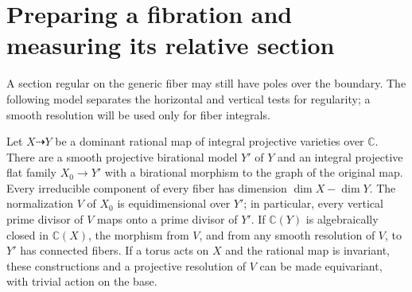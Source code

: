 \section{Preparing a fibration and measuring its relative section}\label{sec:models}

A section regular on the generic fiber may still have poles over the boundary. The following model separates the horizontal and vertical tests for regularity; a smooth resolution will be used only for fiber integrals.

\begin{lemma}\label{val:flat-model}
Let $X\dashrightarrow Y$ be a dominant rational map of integral projective
varieties over $\mathbb C$.  There are a smooth projective birational model
$Y'$ of $Y$ and an integral projective flat family $X_0\to Y'$ with a
birational morphism to the graph of the original map.  Every irreducible
component of every fiber has dimension $\dim X-\dim Y$.  The normalization
$V$ of $X_0$ is equidimensional over $Y'$; in particular, every vertical
prime divisor of $V$ maps onto a prime divisor of $Y'$.  If
$\mathbb C(Y)$ is algebraically closed in $\mathbb C(X)$, the morphism
from $V$, and from any smooth resolution of $V$, to $Y'$ has connected
fibers.  If a torus acts on $X$ and the rational map is invariant, these
constructions and a projective resolution of $V$ can be made equivariant,
with trivial action on the base.
\end{lemma}

